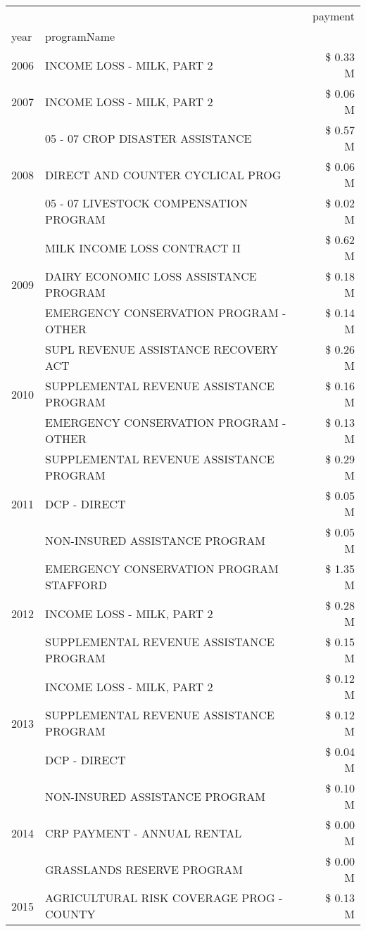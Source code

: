 \begin{tabular}{llr}
\toprule
 &  & payment \\
year & programName &  \\
\midrule
2006 & INCOME LOSS - MILK, PART 2 & \$ 0.33 M \\
\cline{1-3}
2007 & INCOME LOSS - MILK, PART 2 & \$ 0.06 M \\
\cline{1-3}
\multirow[t]{3}{*}{2008} & 05 - 07 CROP DISASTER ASSISTANCE & \$ 0.57 M \\
 & DIRECT AND COUNTER CYCLICAL PROG & \$ 0.06 M \\
 & 05 - 07 LIVESTOCK COMPENSATION PROGRAM & \$ 0.02 M \\
\cline{1-3}
\multirow[t]{3}{*}{2009} & MILK INCOME LOSS CONTRACT II & \$ 0.62 M \\
 & DAIRY ECONOMIC LOSS ASSISTANCE PROGRAM & \$ 0.18 M \\
 & EMERGENCY CONSERVATION PROGRAM - OTHER & \$ 0.14 M \\
\cline{1-3}
\multirow[t]{3}{*}{2010} & SUPL REVENUE ASSISTANCE RECOVERY ACT & \$ 0.26 M \\
 & SUPPLEMENTAL REVENUE ASSISTANCE PROGRAM & \$ 0.16 M \\
 & EMERGENCY CONSERVATION PROGRAM - OTHER & \$ 0.13 M \\
\cline{1-3}
\multirow[t]{3}{*}{2011} & SUPPLEMENTAL REVENUE ASSISTANCE PROGRAM & \$ 0.29 M \\
 & DCP - DIRECT & \$ 0.05 M \\
 & NON-INSURED ASSISTANCE PROGRAM & \$ 0.05 M \\
\cline{1-3}
\multirow[t]{3}{*}{2012} & EMERGENCY CONSERVATION PROGRAM STAFFORD & \$ 1.35 M \\
 & INCOME LOSS - MILK, PART 2 & \$ 0.28 M \\
 & SUPPLEMENTAL REVENUE ASSISTANCE PROGRAM & \$ 0.15 M \\
\cline{1-3}
\multirow[t]{3}{*}{2013} & INCOME LOSS - MILK, PART 2 & \$ 0.12 M \\
 & SUPPLEMENTAL REVENUE ASSISTANCE PROGRAM & \$ 0.12 M \\
 & DCP - DIRECT & \$ 0.04 M \\
\cline{1-3}
\multirow[t]{3}{*}{2014} & NON-INSURED ASSISTANCE PROGRAM & \$ 0.10 M \\
 & CRP PAYMENT - ANNUAL RENTAL & \$ 0.00 M \\
 & GRASSLANDS RESERVE PROGRAM & \$ 0.00 M \\
\cline{1-3}
\multirow[t]{3}{*}{2015} & AGRICULTURAL RISK COVERAGE PROG - COUNTY & \$ 0.13 M \\

\end{tabular}

